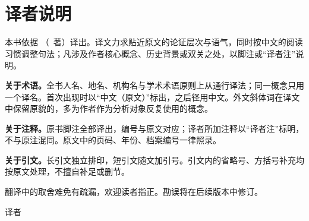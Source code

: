 \chapter*{译者说明}

\begin{flushleft}

本书依据 \textit{\booktitleoriginal}（\bookauthororiginal\ 著）译出。译文力求贴近原文的论证层次与语气，同时按中文的阅读习惯调整句法；凡涉及作者核心概念、历史背景或双关之处，以脚注或“译者注”说明。

\vspace{0.6em}
\textbf{关于术语。}全书人名、地名、机构名与学术术语原则上从通行译法；同一概念只用一个译名。首次出现时以“中文（原文）”标出，之后径用中文。外文斜体词在译文中保留原貌的，多为作者作为分析对象反复使用的概念。

\vspace{0.6em}
\textbf{关于注释。}原书脚注全部译出，编号与原文对应；译者所加注释以“译者注”标明，不与原注混同。原文中的页码、年份、档案编号一律照录。

\vspace{0.6em}
\textbf{关于引文。}长引文独立排印，短引文随文加引号。引文内的省略号、方括号补充均按原文处理，不擅自补足或删节。

\vspace{0.6em}
翻译中的取舍难免有疏漏，欢迎读者指正。勘误将在后续版本中修订。

\vspace{1.2em}
\hfill 译者

\end{flushleft}
